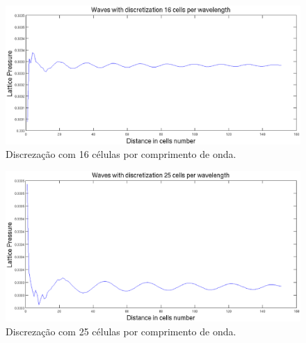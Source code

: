 \begin{figure}[h!]
    \centering
   \hspace{-2.5cm}
    \includegraphics[width=1.2\textwidth]{figuras/pressure_graph_16_cells_discretization.eps}
    \caption{Discrezação com 16 células por comprimento de onda.}
\end{figure}

\begin{figure}[h!]
    \centering
    \hspace{-2.5cm}
    \includegraphics[width=1.2\textwidth]{figuras/pressure_graph_25_cells_discretization.eps}
    \caption{Discrezação com 25 células por comprimento de onda.}
\end{figure}

